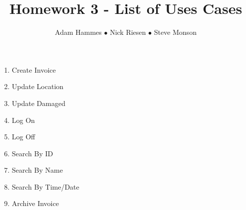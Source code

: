 \documentclass{article}
\title{Homework 3 - List of Uses Cases}
\author{Adam Hammes $\bullet$ Nick Riesen $\bullet$ Steve Monson}
\begin{document}
\maketitle

\begin{enumerate}
    \item Create Invoice
    \item Update Location
    \item Update Damaged
    \item Log On
    \item Log Off
    \item Search By ID
    \item Search By Name
    \item Search By Time/Date
    \item Archive Invoice
\end{enumerate}
\end{document}
